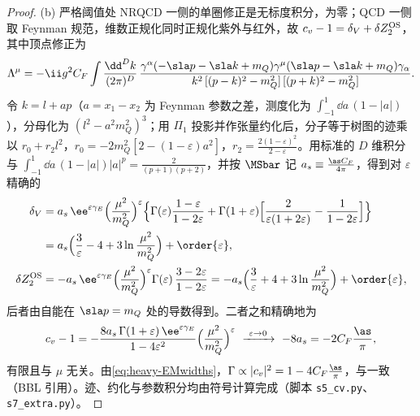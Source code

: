 \begin{proof}
(b) 严格阈值处 NRQCD 一侧的单圈修正是无标度积分，为零；QCD 一侧取 Feynman 规范，维数正规化同时正规化紫外与红外，故 $c_v-1=\delta_V+\delta Z_2^{\rm OS}$，其中顶点修正为
\begin{equation}\label{eq:heavy-vertex}
\Lambda^\mu=-\ii g^2C_F\int\frac{\dd^Dk}{(2\pi)^D}\,\frac{\gamma^\alpha(-\sla p-\sla k+m_Q)\gamma^\mu(\sla p-\sla k+m_Q)\gamma_\alpha}{k^2\,[(p-k)^2-m_Q^2]\,[(p+k)^2-m_Q^2]} .
\end{equation}
令 $k=l+ap$（$a=x_1-x_2$ 为 Feynman 参数之差，测度化为 $\int_{-1}^1\dd a\,(1-|a|)$），分母化为 $(l^2-a^2m_Q^2)^3$；用 $\Pi_1$ 投影并作张量约化后，分子等于树图的迹乘以 $r_0+r_2l^2$，$r_0=-2m_Q^2[2-(1-\varepsilon)a^2]$，$r_2=\frac{2(1-\varepsilon)^2}{2-\varepsilon}$。用标准的 $D$ 维积分与 $\int_{-1}^1\dd a\,(1-|a|)|a|^{p}=\frac{2}{(p+1)(p+2)}$，并按 $\MSbar$ 记 $a_s\equiv\frac{\as C_F}{4\pi}$，得到对 $\varepsilon$ 精确的
\begin{align}
\delta_V&=a_s\,\ee^{\varepsilon\gamma_E}\Big(\frac{\mu^2}{m_Q^2}\Big)^{\varepsilon}\Big\{\Gamma(\varepsilon)\frac{1-\varepsilon}{1-2\varepsilon}+\Gamma(1+\varepsilon)\Big[\frac{2}{\varepsilon(1+2\varepsilon)}-\frac{1}{1-2\varepsilon}\Big]\Big\}\notag\\
&=a_s\Big(\frac3\varepsilon-4+3\ln\frac{\mu^2}{m_Q^2}\Big)+\order{\varepsilon},\label{eq:heavy-dV}\\
\delta Z_2^{\rm OS}&=-a_s\,\ee^{\varepsilon\gamma_E}\Big(\frac{\mu^2}{m_Q^2}\Big)^{\varepsilon}\Gamma(\varepsilon)\,\frac{3-2\varepsilon}{1-2\varepsilon}
=-a_s\Big(\frac3\varepsilon+4+3\ln\frac{\mu^2}{m_Q^2}\Big)+\order{\varepsilon},\label{eq:heavy-dZ2}
\end{align}
后者由自能在 $\sla p=m_Q$ 处的导数得到。二者之和精确地为
\begin{equation}\label{eq:heavy-cv-exact}
c_v-1=-\frac{8a_s\,\Gamma(1+\varepsilon)\,\ee^{\varepsilon\gamma_E}}{1-4\varepsilon^2}\Big(\frac{\mu^2}{m_Q^2}\Big)^{\varepsilon}\ \xrightarrow{\ \varepsilon\to0\ }\ -8a_s=-2C_F\frac{\as}{\pi},
\end{equation}
有限且与 $\mu$ 无关。由\cref{eq:heavy-EMwidths}，$\Gamma\propto|c_v|^2=1-4C_F\frac{\as}{\pi}$，与\cite[式~(A37)]{BodwinBraatenLepage1995}一致（BBL 引用\cite{Barbieri:1975ki,Celmaster:1978yz}）。迹、约化与参数积分均由符号计算完成（脚本 \texttt{s5\_\allowbreak cv.py}、\texttt{s7\_\allowbreak extra.py}）。
\end{proof}

